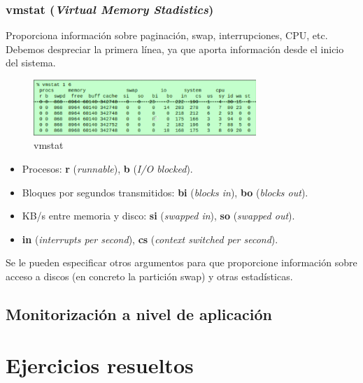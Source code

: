 \documentclass[12pt,spanish]{article}
\begin{document}
\subsubsection{vmstat (\textit{Virtual Memory Stadistics})}
Proporciona información sobre paginación, swap, interrupciones, CPU, etc.\\
Debemos despreciar la primera línea, ya que aporta información desde el inicio del sistema.

\begin{figure}[H]
	\centering
	\includegraphics[width=0.75\textwidth]{vmstat.png}
	\caption{vmstat}
\end{figure}

\begin{itemize}
	\item Procesos: \textbf{r} (\textit{runnable}), \textbf{b} (\textit{I/O blocked}).
	\item Bloques por segundos transmitidos: \textbf{bi} (\textit{blocks in}), \textbf{bo} (\textit{blocks out}).
	\item KB/s entre memoria y disco: \textbf{si} (\textit{swapped in}), \textbf{so} (\textit{swapped out}).
	\item \textbf{in} (\textit{interrupts per second}), \textbf{cs} (\textit{context switched per second}).
\end{itemize}

Se le pueden especificar otros argumentos para que proporcione información sobre acceso a discos (en concreto la partición swap) y otras estadísticas.

\subsection{Monitorización a nivel de aplicación}





\section{Ejercicios resueltos}
\end{document}
